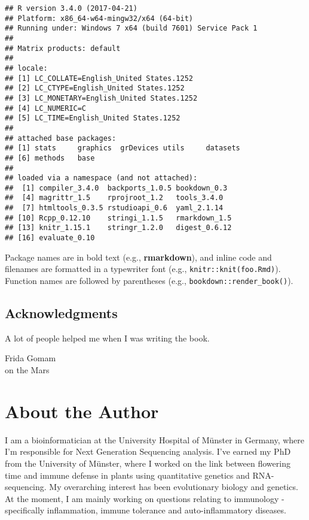 \documentclass[12pt,]{krantz}
\let\BeginKnitrBlock\begin \let\EndKnitrBlock\end
\begin{document}
\begin{verbatim}
## R version 3.4.0 (2017-04-21)
## Platform: x86_64-w64-mingw32/x64 (64-bit)
## Running under: Windows 7 x64 (build 7601) Service Pack 1
## 
## Matrix products: default
## 
## locale:
## [1] LC_COLLATE=English_United States.1252 
## [2] LC_CTYPE=English_United States.1252   
## [3] LC_MONETARY=English_United States.1252
## [4] LC_NUMERIC=C                          
## [5] LC_TIME=English_United States.1252    
## 
## attached base packages:
## [1] stats     graphics  grDevices utils     datasets 
## [6] methods   base     
## 
## loaded via a namespace (and not attached):
##  [1] compiler_3.4.0  backports_1.0.5 bookdown_0.3   
##  [4] magrittr_1.5    rprojroot_1.2   tools_3.4.0    
##  [7] htmltools_0.3.5 rstudioapi_0.6  yaml_2.1.14    
## [10] Rcpp_0.12.10    stringi_1.1.5   rmarkdown_1.5  
## [13] knitr_1.15.1    stringr_1.2.0   digest_0.6.12  
## [16] evaluate_0.10
\end{verbatim}

Package names are in bold text (e.g., \textbf{rmarkdown}), and inline
code and filenames are formatted in a typewriter font (e.g.,
\texttt{knitr::knit(\textquotesingle{}foo.Rmd\textquotesingle{})}).
Function names are followed by parentheses (e.g.,
\texttt{bookdown::render\_book()}).

\section*{Acknowledgments}\label{acknowledgments}


A lot of people helped me when I was writing the book.

\BeginKnitrBlock{flushright}
Frida Gomam\\
on the Mars
\EndKnitrBlock{flushright}

\chapter*{About the Author}\label{about-the-author}


I am a bioinformatician at the University Hospital of Münster in
Germany, where I'm responsible for Next Generation Sequencing analysis.
I've earned my PhD from the University of Münster, where I worked on the
link between flowering time and immune defense in plants using
quantitative genetics and RNA-sequencing. My overarching interest has
been evolutionary biology and genetics. At the moment, I am mainly
working on questions relating to immunology - specifically inflammation,
immune tolerance and auto-inflammatory diseases.
\end{document}
